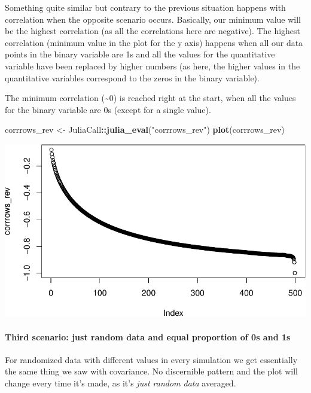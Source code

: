 \documentclass[]{article}
\newenvironment{Shaded}{\begin{snugshade}}{\end{snugshade}}
\newcommand{\KeywordTok}[1]{\textcolor[rgb]{0.13,0.29,0.53}{\textbf{#1}}}
\newcommand{\NormalTok}[1]{#1}
\newcommand{\OperatorTok}[1]{\textcolor[rgb]{0.81,0.36,0.00}{\textbf{#1}}}
\newcommand{\StringTok}[1]{\textcolor[rgb]{0.31,0.60,0.02}{#1}}
\let\oldparagraph\paragraph
\renewcommand{\paragraph}[1]{\oldparagraph{#1}\mbox{}}
\begin{document}
Something quite similar but contrary to the previous situation happens
with correlation when the opposite scenario occurs. Basically, our
minimum value will be the highest correlation (as all the correlations
here are negative). The highest correlation (minimum value in the plot
for the y axis) happens when all our data points in the binary variable
are 1s and all the values for the quantitative variable have been
replaced by higher numbers (as here, the higher values in the
quantitative variables correspond to the zeros in the binary variable).

The minimum correlation (\textasciitilde{}0) is reached right at the
start, when all the values for the binary variable are 0s (except for a
single value).

\begin{Shaded}
\begin{Highlighting}[]
\NormalTok{corrrows_rev <-}\StringTok{ }\NormalTok{JuliaCall}\OperatorTok{::}\KeywordTok{julia_eval}\NormalTok{(}\StringTok{"corrrows_rev"}\NormalTok{)}
\KeywordTok{plot}\NormalTok{(corrrows_rev)}
\end{Highlighting}
\end{Shaded}

\includegraphics{./figures/unnamed-chunk-17-1.pdf}

\newpage

\hypertarget{third-scenario-just-random-data-and-equal-proportion-of-0s-and-1s-1}{%
\paragraph{Third scenario: just random data and equal proportion of 0s
and
1s}\label{third-scenario-just-random-data-and-equal-proportion-of-0s-and-1s-1}}

For randomized data with different values in every simulation we get
essentially the same thing we saw with covariance. No discernible
pattern and the plot will change every time it's made, as it's
\emph{just random data} averaged.
\end{document}
